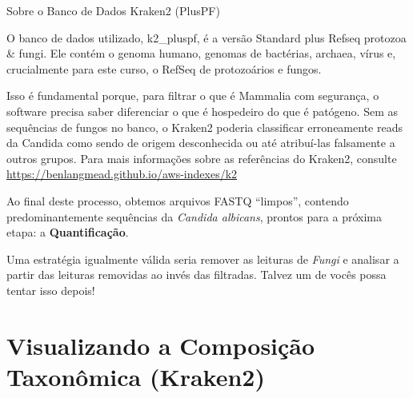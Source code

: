 \documentclass[
  letterpaper,
  DIV=11,
  numbers=noendperiod]{scrreprt}
\begin{document}
\begin{tcolorbox}[enhanced jigsaw, arc=.35mm, bottomrule=.15mm, bottomtitle=1mm, breakable, colback=white, colbacktitle=quarto-callout-tip-color!10!white, colframe=quarto-callout-tip-color-frame, coltitle=black, left=2mm, leftrule=.75mm, opacityback=0, opacitybacktitle=0.6, rightrule=.15mm, title=\textcolor{quarto-callout-tip-color}{\faLightbulb}\hspace{0.5em}{Tip}, titlerule=0mm, toprule=.15mm, toptitle=1mm]

Sobre o Banco de Dados Kraken2 (PlusPF)

O banco de dados utilizado, k2\_pluspf, é a versão Standard plus Refseq
protozoa \& fungi. Ele contém o genoma humano, genomas de bactérias,
archaea, vírus e, crucialmente para este curso, o RefSeq de protozoários
e fungos.

Isso é fundamental porque, para filtrar o que é Mammalia com segurança,
o software precisa saber diferenciar o que é hospedeiro do que é
patógeno. Sem as sequências de fungos no banco, o Kraken2 poderia
classificar erroneamente reads da Candida como sendo de origem
desconhecida ou até atribuí-las falsamente a outros grupos. Para mais
informações sobre as referências do Kraken2, consulte
\url{https://benlangmead.github.io/aws-indexes/k2}

\end{tcolorbox}

Ao final deste processo, obtemos arquivos FASTQ ``limpos'', contendo
predominantemente sequências da \emph{Candida albicans}, prontos para a
próxima etapa: a \textbf{Quantificação}.

\begin{tcolorbox}[enhanced jigsaw, arc=.35mm, bottomrule=.15mm, bottomtitle=1mm, breakable, colback=white, colbacktitle=quarto-callout-note-color!10!white, colframe=quarto-callout-note-color-frame, coltitle=black, left=2mm, leftrule=.75mm, opacityback=0, opacitybacktitle=0.6, rightrule=.15mm, title=\textcolor{quarto-callout-note-color}{\faInfo}\hspace{0.5em}{Ponto Importante}, titlerule=0mm, toprule=.15mm, toptitle=1mm]

Uma estratégia igualmente válida seria remover as leituras de
\emph{Fungi} e analisar a partir das leituras removidas ao invés das
filtradas. Talvez um de vocês possa tentar isso depois!

\end{tcolorbox}

\section{Visualizando a Composição Taxonômica
(Kraken2)}\label{visualizando-a-composiuxe7uxe3o-taxonuxf4mica-kraken2}
\end{document}
